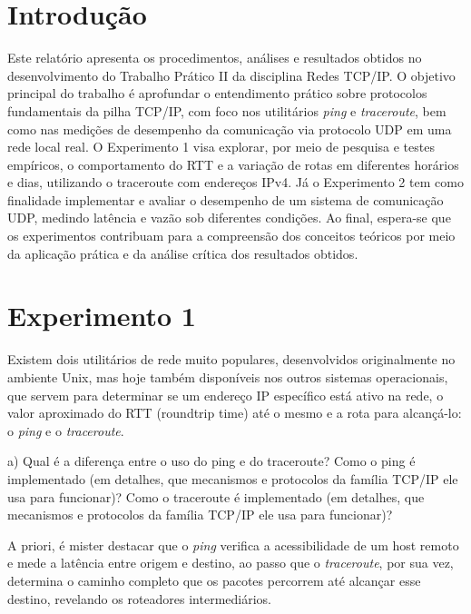 \section{Introdução}

Este relatório apresenta os procedimentos, análises e resultados obtidos no desenvolvimento do Trabalho Prático II da disciplina Redes TCP/IP. O objetivo principal do trabalho é aprofundar o entendimento prático sobre protocolos fundamentais da pilha TCP/IP, com foco nos utilitários \textit{ping} e \textit{traceroute}, bem como nas medições de desempenho da comunicação via protocolo UDP em uma rede local real. O Experimento 1 visa explorar, por meio de pesquisa e testes empíricos, o comportamento do RTT e a variação de rotas em diferentes horários e dias, utilizando o traceroute com endereços IPv4. Já o Experimento 2 tem como finalidade implementar e avaliar o desempenho de um sistema de comunicação UDP, medindo latência e vazão sob diferentes condições. Ao final, espera-se que os experimentos contribuam para a compreensão dos conceitos teóricos por meio da aplicação prática e da análise crítica dos resultados obtidos.

\section{Experimento 1}

Existem dois utilitários de rede muito populares, desenvolvidos originalmente no
ambiente Unix, mas hoje também disponíveis nos outros sistemas operacionais, que servem para
determinar se um endereço IP específico está ativo na rede, o valor aproximado do RTT (roundtrip time) até o mesmo e a rota para alcançá-lo: o \textit{ping} e o \textit{traceroute}.

\bigskip

a) Qual é a diferença entre o uso do ping e do traceroute? Como
o ping é implementado (em detalhes, que mecanismos e protocolos da família TCP/IP ele usa
para funcionar)? Como o traceroute é implementado (em detalhes, que mecanismos e
protocolos da família TCP/IP ele usa para funcionar)?

\bigskip

A priori, é mister destacar que o \textit{ping} verifica a acessibilidade de um host remoto e mede a latência entre origem e destino, ao passo que o \textit{traceroute}, por sua vez, determina o caminho completo que os pacotes percorrem até alcançar esse destino, revelando os roteadores intermediários.

